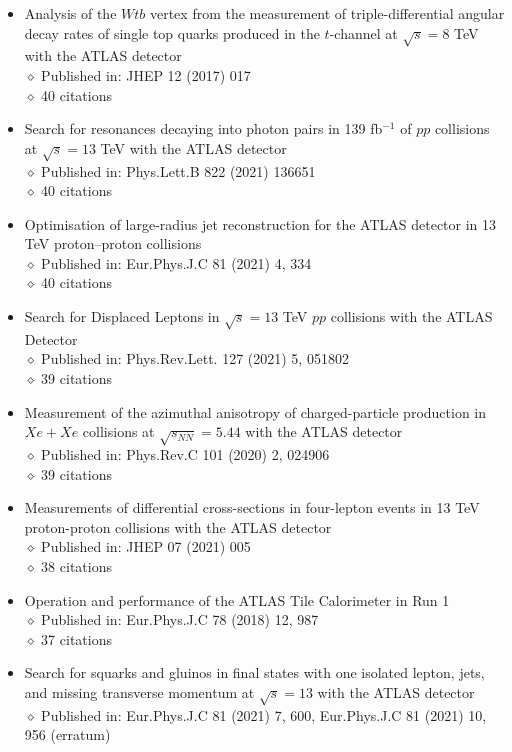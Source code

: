 \documentclass[margin, 10pt]{res} %
\begin{document}
\begin{resume}
\begin{itemize}
\item Analysis of the $Wtb$ vertex from the measurement of triple-differential angular decay rates of single top quarks produced in the $t$-channel at $\sqrt{s} = 8$ TeV with the ATLAS detector\\
$\diamond$ Published in: JHEP 12 (2017) 017\\
$\diamond$ 40 citations
\item Search for resonances decaying into photon pairs in 139 fb$^{-1}$ of $pp$ collisions at $\sqrt{s} = 13$ TeV with the ATLAS detector\\
$\diamond$ Published in: Phys.Lett.B 822 (2021) 136651\\
$\diamond$ 40 citations
\item Optimisation of large-radius jet reconstruction for the ATLAS detector in 13 TeV proton–proton collisions\\
$\diamond$ Published in: Eur.Phys.J.C 81 (2021) 4, 334\\
$\diamond$ 40 citations
\item Search for Displaced Leptons in $\sqrt{s} = 13$ TeV $pp$ collisions with the ATLAS Detector\\
$\diamond$ Published in: Phys.Rev.Lett. 127 (2021) 5, 051802\\
$\diamond$ 39 citations
\item Measurement of the azimuthal anisotropy of charged-particle production in $Xe + Xe$ collisions at $\sqrt{s_{NN}} = 5.44$  with the ATLAS detector\\
$\diamond$ Published in: Phys.Rev.C 101 (2020) 2, 024906\\
$\diamond$ 39 citations
\item Measurements of differential cross-sections in four-lepton events in 13 TeV proton-proton collisions with the ATLAS detector\\
$\diamond$ Published in: JHEP 07 (2021) 005\\
$\diamond$ 38 citations
\item Operation and performance of the ATLAS Tile Calorimeter in Run 1\\
$\diamond$ Published in: Eur.Phys.J.C 78 (2018) 12, 987\\
$\diamond$ 37 citations
\item Search for squarks and gluinos in final states with one isolated lepton, jets, and missing transverse momentum at $\sqrt{s} = 13$  with the ATLAS detector\\
$\diamond$ Published in: Eur.Phys.J.C 81 (2021) 7, 600, Eur.Phys.J.C 81 (2021) 10, 956 (erratum)\\

\end{itemize}
\end{resume}
\end{document}
